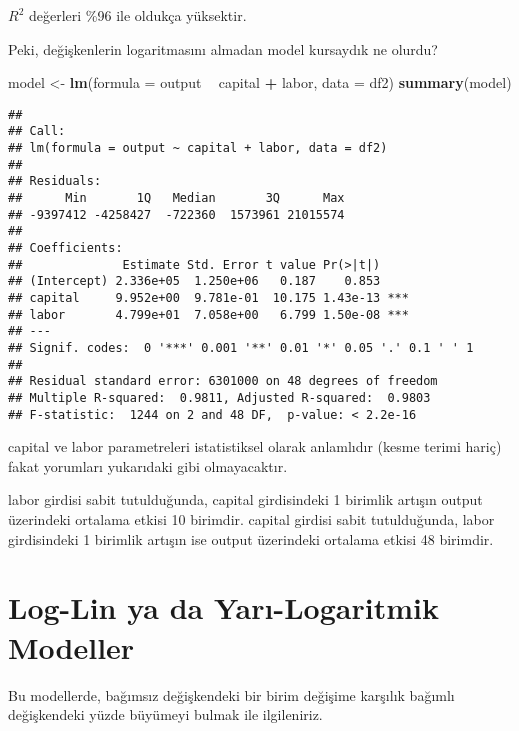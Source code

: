 \documentclass[
]{book}
\newenvironment{Shaded}{\begin{snugshade}}{\end{snugshade}}
\newcommand{\CommentTok}[1]{\textcolor[rgb]{0.56,0.35,0.01}{\textit{#1}}}
\newcommand{\DataTypeTok}[1]{\textcolor[rgb]{0.13,0.29,0.53}{#1}}
\newcommand{\KeywordTok}[1]{\textcolor[rgb]{0.13,0.29,0.53}{\textbf{#1}}}
\newcommand{\NormalTok}[1]{#1}
\newcommand{\OperatorTok}[1]{\textcolor[rgb]{0.81,0.36,0.00}{\textbf{#1}}}
\newcommand{\StringTok}[1]{\textcolor[rgb]{0.31,0.60,0.02}{#1}}
\begin{document}
\(R^2\) değerleri \%96 ile oldukça yüksektir.

Peki, değişkenlerin logaritmasını almadan model kursaydık ne olurdu?

\begin{Shaded}
\begin{Highlighting}[]
\NormalTok{model <-}\StringTok{ }\KeywordTok{lm}\NormalTok{(}\DataTypeTok{formula =}\NormalTok{ output }\OperatorTok{~}\StringTok{ }\NormalTok{capital }\OperatorTok{+}\StringTok{ }\NormalTok{labor, }\DataTypeTok{data =}\NormalTok{ df2)}
\KeywordTok{summary}\NormalTok{(model)}
\end{Highlighting}
\end{Shaded}

\begin{verbatim}
## 
## Call:
## lm(formula = output ~ capital + labor, data = df2)
## 
## Residuals:
##      Min       1Q   Median       3Q      Max 
## -9397412 -4258427  -722360  1573961 21015574 
## 
## Coefficients:
##              Estimate Std. Error t value Pr(>|t|)    
## (Intercept) 2.336e+05  1.250e+06   0.187    0.853    
## capital     9.952e+00  9.781e-01  10.175 1.43e-13 ***
## labor       4.799e+01  7.058e+00   6.799 1.50e-08 ***
## ---
## Signif. codes:  0 '***' 0.001 '**' 0.01 '*' 0.05 '.' 0.1 ' ' 1
## 
## Residual standard error: 6301000 on 48 degrees of freedom
## Multiple R-squared:  0.9811, Adjusted R-squared:  0.9803 
## F-statistic:  1244 on 2 and 48 DF,  p-value: < 2.2e-16
\end{verbatim}

capital ve labor parametreleri istatistiksel olarak anlamlıdır (kesme terimi hariç) fakat yorumları yukarıdaki gibi olmayacaktır.

labor girdisi sabit tutulduğunda, capital girdisindeki 1 birimlik artışın output üzerindeki ortalama etkisi 10 birimdir. capital girdisi sabit tutulduğunda, labor girdisindeki 1 birimlik artışın ise output üzerindeki ortalama etkisi 48 birimdir.

\hypertarget{log-lin-ya-da-yarux131-logaritmik-modeller}{%
\section{Log-Lin ya da Yarı-Logaritmik Modeller}\label{log-lin-ya-da-yarux131-logaritmik-modeller}}

Bu modellerde, bağımsız değişkendeki bir birim değişime karşılık bağımlı değişkendeki yüzde büyümeyi bulmak ile ilgileniriz.

\begin{Shaded}
\end{Shaded}
\end{document}
